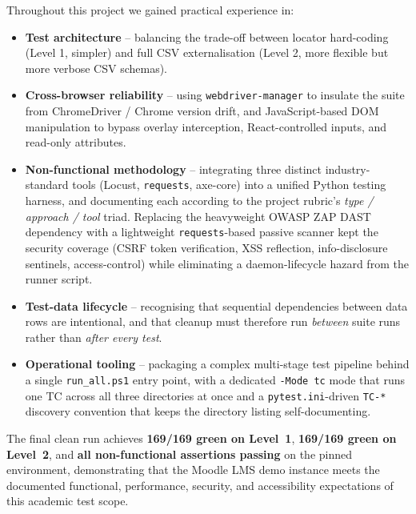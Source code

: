 \documentclass[twoside,final]{hcmut-report}
\begin{document}
Throughout this project we gained practical experience in:
\begin{itemize}
    \item \textbf{Test architecture} -- balancing the trade-off between locator hard-coding (Level 1, simpler) and full CSV externalisation (Level 2, more flexible but more verbose CSV schemas).
    \item \textbf{Cross-browser reliability} -- using \texttt{webdriver-manager} to insulate the suite from ChromeDriver / Chrome version drift, and JavaScript-based DOM manipulation to bypass overlay interception, React-controlled inputs, and read-only attributes.
    \item \textbf{Non-functional methodology} -- integrating three distinct industry-standard tools (Locust, \texttt{requests}, axe-core) into a unified Python testing harness, and documenting each according to the project rubric's \emph{type / approach / tool} triad. Replacing the heavyweight OWASP ZAP DAST dependency with a lightweight \texttt{requests}-based passive scanner kept the security coverage (CSRF token verification, XSS reflection, info-disclosure sentinels, access-control) while eliminating a daemon-lifecycle hazard from the runner script.
    \item \textbf{Test-data lifecycle} -- recognising that sequential dependencies between data rows are intentional, and that cleanup must therefore run \emph{between} suite runs rather than \emph{after every test}.
    \item \textbf{Operational tooling} -- packaging a complex multi-stage test pipeline behind a single \texttt{run\_all.ps1} entry point, with a dedicated \texttt{-Mode tc} mode that runs one TC across all three directories at once and a \texttt{pytest.ini}-driven \texttt{TC-*} discovery convention that keeps the directory listing self-documenting.
\end{itemize}

The final clean run achieves \textbf{169/169 green on Level~1}, \textbf{169/169 green on Level~2}, and \textbf{all non-functional assertions passing} on the pinned environment, demonstrating that the Moodle LMS demo instance meets the documented functional, performance, security, and accessibility expectations of this academic test scope.
\end{document}
